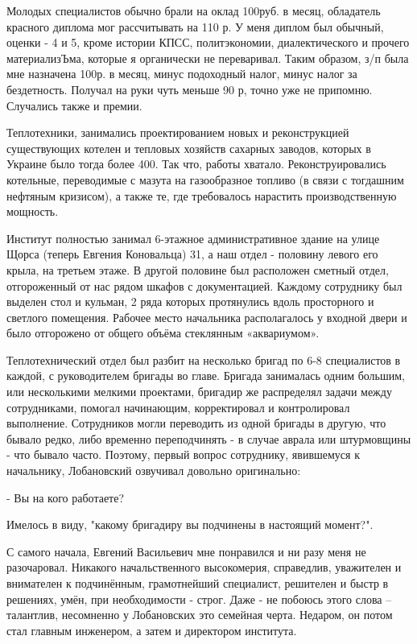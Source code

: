 Молодых специалистов обычно брали на оклад 100руб. в месяц, обладатель красного
диплома мог рассчитывать на 110 р. У меня диплом был обычный, оценки - 4 и 5,
кроме истории КПСС, политэкономии, диалектического и прочего материализЪма,
которые я органически не переваривал. Таким образом, з/п была мне назначена
100р. в месяц, минус подоходный налог, минус налог за бездетность. Получал на
руки чуть меньше 90 р, точно уже не припомню. Случались также и премии.

Теплотехники, занимались проектированием новых и реконструкцией существующих
котелен и тепловых хозяйств сахарных заводов, которых в Украине было тогда
более 400. Так что, работы хватало. Реконструировались котельные, переводимые с
мазута на газообразное топливо (в связи с тогдашним нефтяным кризисом), а также
те, где требовалось нарастить производственную мощность.

Институт полностью занимал 6-этажное административное здание на улице Щорса
(теперь Евгения Коновальца) 31, а наш отдел  - половину левого его крыла, на
третьем этаже. В другой половине был расположен сметный отдел, отгороженный от
нас рядом шкафов с документацией. Каждому сотруднику был выделен стол и
кульман, 2 ряда которых протянулись вдоль просторного и светлого помещения.
Рабочее место начальника располагалось у входной двери и было отгорожено от
общего объёма стеклянным «аквариумом».

Теплотехнический отдел был разбит на несколько бригад по 6-8 специалистов в
каждой, с руководителем бригады во главе. Бригада занималась одним большим, или
несколькими мелкими проектами, бригадир же распределял задачи между
сотрудниками, помогал начинающим, корректировал и контролировал выполнение.
Сотрудников могли переводить из одной бригады в другую, что бывало редко, либо
временно переподчинять - в случае аврала или штурмовщины - что бывало часто.
Поэтому, первый вопрос сотруднику, явившемуся к начальнику, Лобановский
озвучивал довольно  оригинально:

- Вы на кого работаете?

Имелось в виду, "какому бригадиру вы подчинены в настоящий момент?".

С самого начала, Евгений Васильевич мне понравился и ни разу меня не
разочаровал. Никакого начальственного высокомерия, справедлив, уважителен и
внимателен к подчинённым, грамотнейший специалист, решителен и быстр в
решениях, умён, при необходимости - строг. Даже - не побоюсь этого слова –
талантлив, несомненно у Лобановских это семейная черта. Недаром, он потом стал
главным инженером, а затем и директором института.

